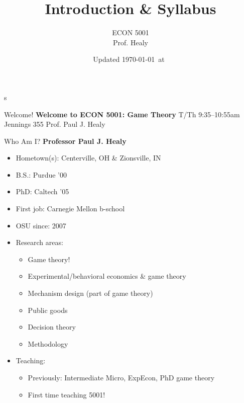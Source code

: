

\title[Introduction]{Introduction \& Syllabus}
\author[ECON 5001]{ECON 5001\\Prof. Healy} \color{metrop}
\institute[OSU]{}
\date[]{\vfill {\tiny Updated \today\ at\ \DTMcurrenttime}}



\frame{\maketitle}
s
\begin{frame}{Welcome!}
\vfill
\centering
\large
\textbf{Welcome to ECON 5001: Game Theory}
\bsk
T/Th 9:35--10:55am Jennings 355
\bsk
Prof. Paul J. Healy
\bsk
\vfill
\end{frame}

\begin{frame}{Who Am I?}
    \textbf{Professor Paul J. Healy}
    \begin{itemize}
        \item Hometown(s): Centerville, OH \& Zionsville, IN
        \item B.S.: Purdue '00
        \item PhD: Caltech '05
        \item First job: Carnegie Mellon b-school
        \item OSU since: 2007
        \item Research areas:
        \begin{itemize}
            \item Game theory!
            \item Experimental/behavioral economics \& game theory
            \item Mechanism design (part of game theory)
            \item Public goods
            \item Decision theory
            \item Methodology
        \end{itemize}
        \item Teaching:
        \begin{itemize}
            \item Previously: Intermediate Micro, ExpEcon, PhD game theory
            \item First time teaching 5001! 
        \end{itemize}
    \end{itemize}
\end{frame}

